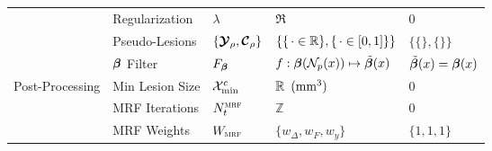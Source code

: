 \begin{table}
\begin{tabular}{lllll}
                                     & Regularization       & $\lambda$                   & $\Re$                                         & 0                         \\
                                     & Pseudo-Lesions       & $\{\bm{\mathcal{Y}}_{\rho},\bm{\mathcal{C}}_{\rho}\}$ & $\{\{\thinspace\cdot\in\mathbb{R}\},\{\thinspace\cdot\in[0,1]\}\}$ & $\{\{\},\{\}\}$           \\
                                     & $\bm{\beta}$ Filter         & $F_{\bm{\beta}}$                   & $f: \bm{\beta}(\mathcal{N}_p(x)) \mapsto \tilde{\bm{\beta}}(x)$      & $\tilde{\bm{\beta}}(x) = \bm{\beta}(x)$ \\ \hline
    \multirow{3}{*}{Post-Processing} & Min Lesion  Size     & $\mathcal{X}_{\min}^{c}$             & $\mathbb{R}\enspace(\text{mm}^{3})$                       & 0                         \\
                                     & MRF Iterations       & $N_{t}^{\textsc{mrf}}$              & $\mathbb{Z}$                                  & 0                         \\
                                     & MRF Weights          & $W_{\textsc{mrf}}$                  & $\{w_{\Delta},w_{F},w_y\}$                    & $\{1,1,1\}$               \\ \hline
  \end{tabular}
\end{table}
